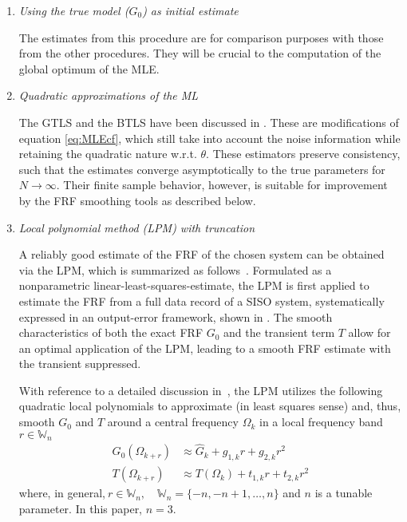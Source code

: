 \begin{enumerate}
\item
\emph{Using the true model ($G_0$) as initial estimate}

The estimates from this procedure are for comparison purposes with those from the other procedures. They will be crucial to the computation of the global optimum of the \gls{MLE}.

\item
\emph{Quadratic approximations of the ML}


The \gls{GTLS} and the \gls{BTLS} have been discussed in \citep{Pintelon1998}. These are modifications of equation \eqref{eq:MLEcf}, which still take into account the noise information while retaining the quadratic nature w.r.t. $\theta$. 
These estimators preserve consistency, such that the estimates converge asymptotically to the true parameters for $N\to\infty$. 
Their finite sample behavior, however, is suitable for improvement by the \gls{FRF} smoothing tools as described below.

\item
\emph{Local polynomial method (LPM) with truncation}

A reliably good estimate of the FRF of the chosen system can be obtained via the LPM, which is summarized as follows~\citep{Lumori2014TIM}. Formulated as a nonparametric linear-least-squares-estimate, the LPM is first applied to estimate the FRF from a full data record of a SISO system, systematically expressed in an output-error framework, shown in . The smooth characteristics of both the exact \gls{FRF} $G_0$ and the transient term $T$ allow for an optimal application of the \gls{LPM}, leading to a smooth \gls{FRF} estimate with the transient suppressed.

  With reference to a detailed discussion in~\citep{Lumori2014TIM}, the \gls{LPM} utilizes the following quadratic local polynomials to approximate (in least squares sense) and, thus, smooth $G_0$ and $T$ around a central frequency $\Omega_{k}$ in a local frequency band $r\in\mathbb{W}_n$
\begin{subequations}\label{lpmImplQuadG}
\begin{align}
G_0(\Omega_{k+r})&\approx \hat G_k + g_{1,k} r + g_{2,k}r^2
\\
T(\Omega_{k+r})&\approx T(\Omega_k)+t_{1,k}r + t_{2,k}r^2\label{lpmImplQuadT}
\end{align}
\end{subequations}
where, in general,$\ r\in\mathbb{W}_n,\quad$$\mathbb{W}_n = \{-n,-n+1,\dots,n\}$ and $n$ is a tunable parameter. In this paper, $n=3$.


\end{enumerate}
